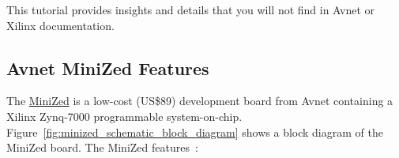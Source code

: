 This tutorial provides insights and details that you will not find in Avnet 
or Xilinx documentation.

\clearpage
\subsection{Avnet MiniZed Features}

The \href{http://www.minized.org}{MiniZed} is a low-cost (US\$89) development
board from Avnet containing a Xilinx Zynq-7000 programmable system-on-chip.
%
Figure~\ref{fig:minized_schematic_block_diagram} shows a block diagram of
the MiniZed board. The MiniZed
features~\cite{Avnet_MiniZed_HW_2020,Avnet_MiniZed_Schematic_2017}:
%
